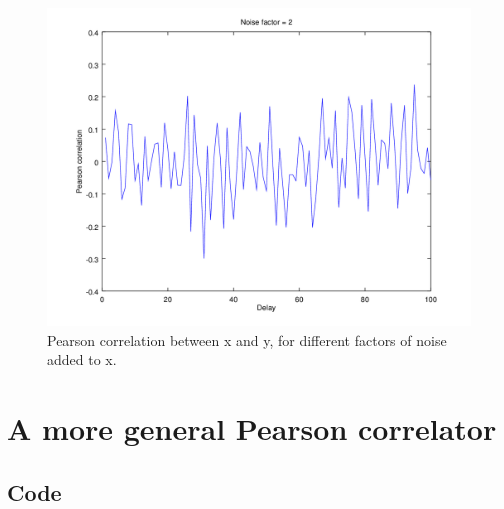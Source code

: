 \documentclass{article}
\begin{document}
\begin{figure}[H]
	\includegraphics[width=.49\textwidth]{plot2noise.png}
	\caption{Pearson correlation between x and y, for different factors of noise added to x.}
	\label{fig:1g2}
\end{figure}

\section{A more general Pearson correlator}

\begin{appendices}
\section{Code}
 
 
  
  
 
\end{appendices}
\end{document}
